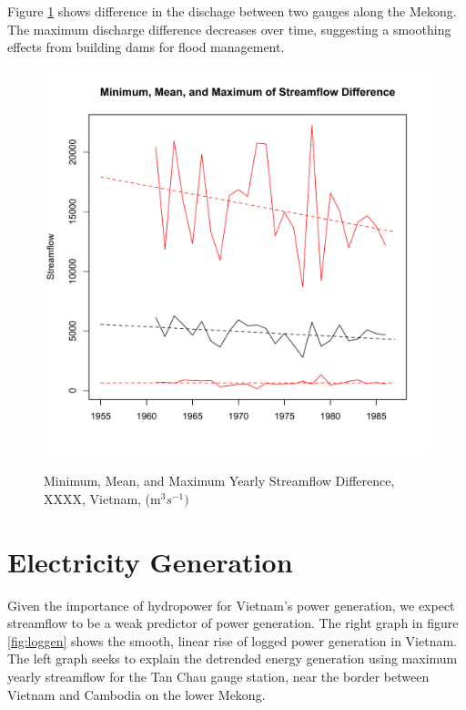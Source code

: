 \documentclass[11pt,english]{article}
\theoremstyle{plain} \newtheorem{claim}{Claim}
\theoremstyle{plain} \newtheorem{prop}{Proposition}
\theoremstyle{plain} \newtheorem{hypo}{Hypothesis}
\begin{document}
Figure \ref{diff} shows difference in the dischage between two gauges along the Mekong.  %
The maximum discharge difference decreases over time, suggesting a smoothing effects from building dams for flood management.

\begin{figure}
\includegraphics{Displays/difference-year.pdf}
\label{diff}
\caption{Minimum, Mean, and Maximum Yearly Streamflow Difference, XXXX, Vietnam,  (m$^3 s^{-1})$}
\end{figure}

\section{Electricity Generation}

Given the importance of hydropower for Vietnam's power generation, we expect streamflow to be a weak predictor of power generation.  The right graph in figure \ref{fig:loggen} shows the smooth, linear rise of logged power generation in Vietnam.  The left graph seeks to explain the detrended energy generation using maximum yearly streamflow for the Tan Chau gauge station, near the border between Vietnam and Cambodia on the lower Mekong.
\end{document}
